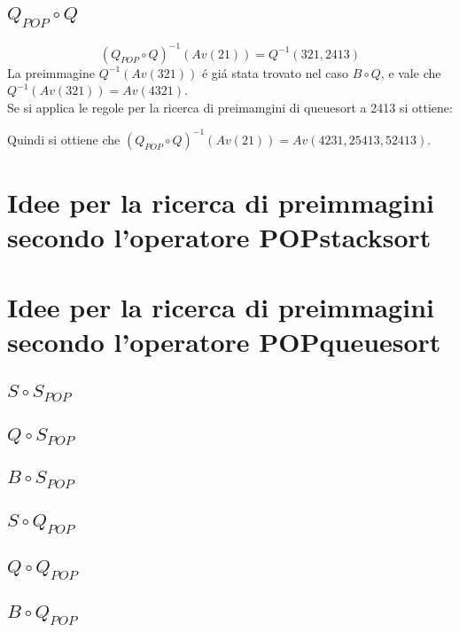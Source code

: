 \subsection*{$Q_{POP}\circ{Q}$}
$$(Q_{POP}\circ{Q})^{-1}(Av(21)) = Q^{-1}(321, 2413)$$
La preimmagine $Q^{-1}(Av(321))$ \'e gi\'a stata trovato nel caso $B\circ{Q}$, e vale che $Q^{-1}(Av(321)) = Av(4321)$.\\
Se si applica le regole per la ricerca di preimamgini di queuesort a 2413 si ottiene:
\begin{center}\end{center}
Quindi si ottiene che $(Q_{POP}\circ{Q})^{-1}(Av(21)) = Av(4231, 25413, 52413)$.
\section*{Idee per la ricerca di preimmagini secondo l'operatore POPstacksort}
\section*{Idee per la ricerca di preimmagini secondo l'operatore POPqueuesort}
\subsection*{$S\circ{S_{POP}}$}
\subsection*{$Q\circ{S_{POP}}$}
\subsection*{$B\circ{S_{POP}}$}
\subsection*{$S\circ{Q_{POP}}$}
\subsection*{$Q\circ{Q_{POP}}$}
\subsection*{$B\circ{Q_{POP}}$}
